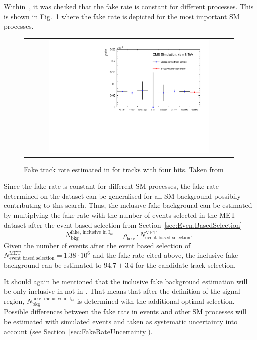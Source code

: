 Within~\cite{bib:CMS:DT_Thesis,bib:CMS:DT_8TeV_AN}, it was checked that the fake rate is constant for different processes.
This is shown in Fig.~\ref{fig:FakeRate} where the fake rate is depicted for the most important SM processes.
\begin{figure}[!b]
  \centering 
  \begin{tabular}{c}
    \includegraphics[width=0.79\textwidth]{figures/analysis/Background/fakeTrkRates.pdf}
  \end{tabular}
  \caption{Fake track rate estimated in \cite{bib:CMS:DT_Thesis,bib:CMS:DT_8TeV_AN} for tracks with four hits. Taken from \cite{bib:CMS:DT_8TeV_AN} }
  \label{fig:FakeRate}
\end{figure}
Since the fake rate is constant for different SM processes, the fake rate determined on the \Zlep dataset can be generalised for all SM background possibily contributing to this search.
Thus, the inclusive fake background can be estimated by multiplying the fake rate with the number of events selected in the MET dataset after the event based selection from Section~\ref{sec:EventBasedSelection}
\begin{equation*}
N^{\text{fake, inclusive in I$_{\text{as}}$}}_{\text{bkg}} = \rho_{\text{fake}} \cdot N_{\text{event based selection}}^{\text{MET}}.
\end{equation*}
Given the number of events after the event based selection of $N_{\text{event based selection}}^{\text{MET}} = 1.38\cdot10^6$ and the fake rate cited above, 
the inclusive fake background can be estimated to $94.7\pm3.4$ for the candidate track selection.

It should again be mentioned that the inclusive fake background estimation will be only inclusive in \ias not in \pt.
That means that after the definition of the signal region, $N^{\text{fake, inclusive in I$_{\text{as}}$}}_{\text{bkg}}$ is determined with the additional optimal \pt selection.
Possible differences between the fake rate in \Zlep events and other SM processes will be estimated with simulated events and taken as systematic uncertainty into account (see Section~\ref{sec:FakeRateUncertainty}).


